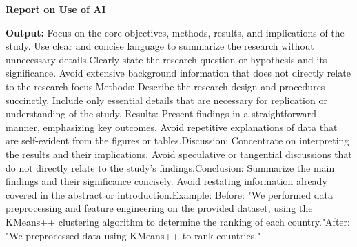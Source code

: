 \documentclass[12pt]{article}  %
\begin{document}
\begin{subappendices}
\begin{letter}{\centering \underline{\textbf{Report on Use of AI}}}
\begin{itemize}
		\subitem\textbf{Output: }Focus on the core objectives, methods, results, and implications of the study. Use clear and concise language to summarize the research without unnecessary details.Clearly state the research question or hypothesis and its significance. Avoid extensive background information that does not directly relate to the research focus.Methods: Describe the research design and procedures succinctly. Include only essential details that are necessary for replication or understanding of the study. Results: Present findings in a straightforward manner, emphasizing key outcomes. Avoid repetitive explanations of data that are self-evident from the figures or tables.Discussion: Concentrate on interpreting the results and their implications. Avoid speculative or tangential discussions that do not directly relate to the study's findings.Conclusion: Summarize the main findings and their significance concisely. Avoid restating information already covered in the abstract or introduction.Example: Before: "We performed data preprocessing and feature engineering on the provided dataset, using the KMeans++ clustering algorithm to determine the ranking of each country."After: "We preprocessed data using KMeans++ to rank countries."
	\end{itemize}
\end{letter}





\end{subappendices}  %
\end{document}
